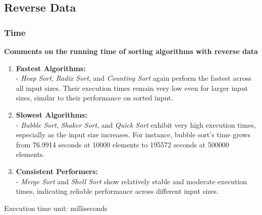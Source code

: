 \subsection{Reverse Data}
\subsubsection{Time}
\textbf{Comments on the running time of sorting algorithms with reverse data}
\begin{enumerate}
    \item \textbf{Fastest Algorithms:} \\
- \textit{Heap Sort}, \textit{Radix Sort}, and \textit{Counting Sort} again perform the fastest across all input sizes. Their execution times remain very low even for larger input sizes, similar to their performance on sorted input.

    \item \textbf{Slowest Algorithms:} \\
- \textit{Bubble Sort}, \textit{Shaker Sort}, and \textit{Quick Sort} exhibit very high execution times, especially as the input size increases. For instance, bubble sort's time grows from 76.9914 seconds at 10000 elements to 195572 seconds at 500000 elements.

    \item \textbf{Consistent Performers:} \\
- \textit{Merge Sort} and \textit{Shell Sort} show relatively stable and moderate execution times, indicating reliable performance across different input sizes.
\end{enumerate}

Execution time unit: milliseconds

